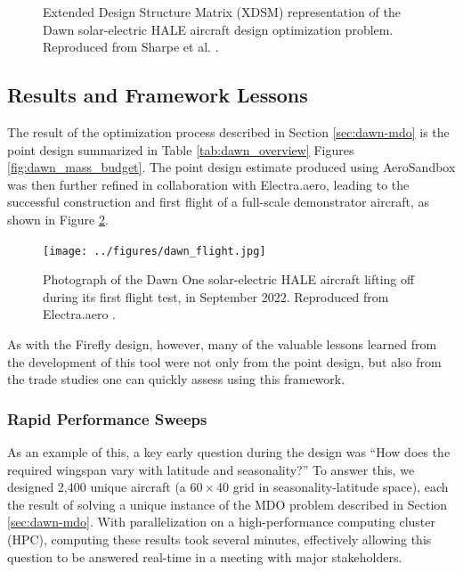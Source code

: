 \begin{figure}[h]
    \centering
    \begin{adjustbox}{width=\textwidth,center,trim={3.5in 0 0.25in 0}}
        
    \end{adjustbox}
    \caption{Extended Design Structure Matrix (XDSM) representation of the Dawn solar-electric HALE aircraft design optimization problem. Reproduced from Sharpe et al. \cite{sharpe_optimization_2021}.}
    \label{fig:dawn_xdsm}
\end{figure}

\subsection{Results and Framework Lessons}

The result of the optimization process described in Section \ref{sec:dawn-mdo} is the point design summarized in Table \ref{tab:dawn_overview} Figures \ref{fig:dawn_mass_budget}. The point design estimate produced using AeroSandbox was then further refined in collaboration with Electra.aero, leading to the successful construction and first flight of a full-scale demonstrator aircraft, as shown in Figure \ref{fig:dawn_flight}.

\begin{figure}[h]
    \centering
    \texttt{[image: ../figures/dawn\_flight.jpg]}
    \caption{Photograph of the Dawn One solar-electric HALE aircraft lifting off during its first flight test, in September 2022. Reproduced from Electra.aero \cite{electra_dawn_flight}.}
    \label{fig:dawn_flight}
\end{figure}

As with the Firefly design, however, many of the valuable lessons learned from the development of this tool were not only from the point design, but also from the trade studies one can quickly assess using this framework.

\subsubsection*{Rapid Performance Sweeps}

As an example of this, a key early question during the design was ``How does the required wingspan vary with latitude and seasonality?'' To answer this, we designed 2,400 unique aircraft (a $60\times40$ grid in seasonality-latitude space), each the result of solving a unique instance of the MDO problem described in Section \ref{sec:dawn-mdo}. With parallelization on a high-performance computing cluster (HPC), computing these results took several minutes, effectively allowing this question to be answered real-time in a meeting with major stakeholders.

